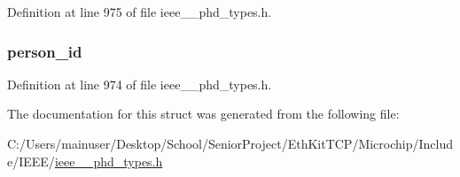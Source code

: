 Definition at line 975 of file ieee\+\_\+\_\+phd\+\_\+types.\+h.

\hypertarget{struct___scan_report_per_grouped_a220a46bb779d76e54fe1dd1a26f2d635}{}
\subsubsection[{person\+\_\+id}]{ person\+\_\+id}\label{struct___scan_report_per_grouped_a220a46bb779d76e54fe1dd1a26f2d635}


Definition at line 974 of file ieee\+\_\+\_\+phd\+\_\+types.\+h.



The documentation for this struct was generated from the following file\+:\begin{DoxyCompactItemize}
\item 
C\+:/\+Users/mainuser/\+Desktop/\+School/\+Senior\+Project/\+Eth\+Kit\+T\+C\+P/\+Microchip/\+Include/\+I\+E\+E\+E/\hyperlink{ieee__11073__phd__types_8h}{ieee\+\_\+\_\+phd\+\_\+types.\+h}\end{DoxyCompactItemize}
